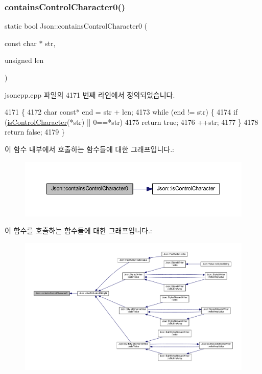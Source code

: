\subsubsection{\texorpdfstring{contains\+Control\+Character0()}{containsControlCharacter0()}}
{\footnotesize\ttfamily static bool Json\+::contains\+Control\+Character0 (\begin{DoxyParamCaption}\item[{const char $\ast$}]{str,  }\item[{unsigned}]{len }\end{DoxyParamCaption})\hspace{0.3cm}{\ttfamily [static]}}



jsoncpp.\+cpp 파일의 4171 번째 라인에서 정의되었습니다.


\begin{DoxyCode}
4171                                                                      \{
4172   \textcolor{keywordtype}{char} \textcolor{keyword}{const}* end = str + len;
4173   \textcolor{keywordflow}{while} (end != str) \{
4174     \textcolor{keywordflow}{if} (\hyperlink{namespace_json_a0381e631737f51331065a388f4f59197}{isControlCharacter}(*str) || 0==*str)
4175       \textcolor{keywordflow}{return} \textcolor{keyword}{true};
4176     ++str;
4177   \}
4178   \textcolor{keywordflow}{return} \textcolor{keyword}{false};
4179 \}
\end{DoxyCode}
이 함수 내부에서 호출하는 함수들에 대한 그래프입니다.\+:\nopagebreak
\begin{figure}[H]
\begin{center}
\leavevmode
\includegraphics[width=350pt]{namespace_json_ae8a357381f264cf28f46449e79ab1dea_cgraph}
\end{center}
\end{figure}
이 함수를 호출하는 함수들에 대한 그래프입니다.\+:\nopagebreak
\begin{figure}[H]
\begin{center}
\leavevmode
\includegraphics[width=350pt]{namespace_json_ae8a357381f264cf28f46449e79ab1dea_icgraph}
\end{center}
\end{figure}
